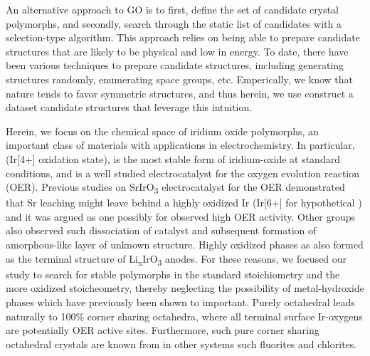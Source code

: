An alternative approach to GO is to first, define the set of candidate crystal polymorphs, and secondly, search through the static list of candidates with a selection-type algorithm.
%
This approach relies on being able to prepare candidate structures that are likely to be physical and low in energy.
To date, there have been various techniques to prepare candidate structures, including generating structures randomly, enumerating space groups, etc.
%
Emperically, we know that nature tends to favor symmetric structures, and thus herein, we use construct a dataset candidate structures that leverage this intuition.


Herein, we focus on the chemical space of iridium oxide polymorphs,
an important class of materials with applications in electrochemistry.
%
In particular, \rIrOtwo (Ir[4+] oxidation state), is the most stable form of iridium-oxide at standard conditions,
and is a well studied electrocatalyst for the oxygen evolution reaction (OER).
\cite{Seitz2016,Lee2012a,McCrory2015,Trotochaud2012,Danilovic2014,Carmo2013,Miles1978,Beni1979}
%
Previous studies on SrIrO\textsubscript{3} electrocatalyst for the OER demonstrated that Sr leaching might leave behind a highly oxidized Ir (Ir[6+] for hypothetical \IrOthree) and it was argued as one possibly for observed high OER activity.\cite{Seitz2016}
%
Other groups also observed such dissociation of \IrOx catalyst and subsequent formation of amorphous-like layer of unknown structure. \cite{Pearce2017}
%
Highly oxidized \IrOthree phases as also formed as the terminal structure of Li\textsubscript{x}IrO\textsubscript{3} anodes.\cite{Pearce2017}
%
For these reasons, we focused our study to search for stable polymorphs in the standard \IrOtwo stoichiometry and the more oxidized \IrOthree stoicheometry,
thereby neglecting the possibility of metal-hydroxide phases which have previously been shown to important.
%
Purely octahedral \IrOthree leads naturally to 100\% corner sharing octahedra,
where all terminal surface Ir-oxygens are potentially OER active sites.
%
Furthermore, such pure corner sharing octahedral crystals are known from in other systems such fluorites and chlorites.


